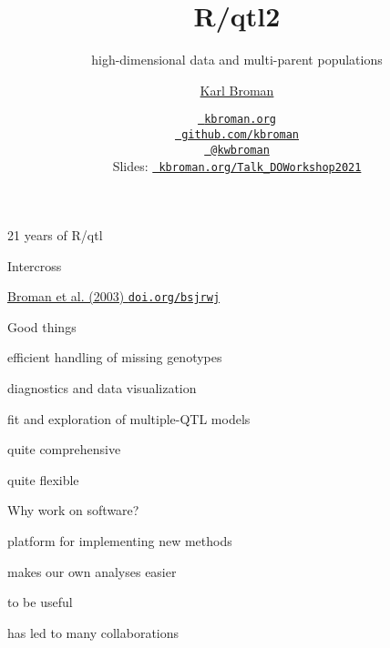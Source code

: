 \documentclass[12pt,t,aspectratio=169]{beamer}
\title{R/qtl2}
\subtitle{high-dimensional data and multi-parent populations}
\author{\href{https://kbroman.org}{Karl Broman}}
\institute{Biostatistics \& Medical Informatics, UW{\textendash}Madison}
\date{\href{https://kbroman.org}{\tt \scriptsize \color{foreground} kbroman.org}
\\[-4pt]
\href{https://github.com/kbroman}{\tt \scriptsize \color{foreground} github.com/kbroman}
\\[-4pt]
\href{https://twitter.com/kwbroman}{\tt \scriptsize \color{foreground} @kwbroman}
\\[2pt]
\scriptsize {\lolit Slides:} \href{https://kbroman.org/Talk_DOWorkshop2021}{\tt \scriptsize
  \color{foreground} kbroman.org/Talk\_DOWorkshop2021}
}
\begin{document}
{
 }



\begin{frame}[c]{21 years of R/qtl}


\end{frame}





\begin{frame}[c]{Intercross}
\end{frame}



\begin{frame}[c]{}



\hfill
\href{https://doi.org/10.1093/bioinformatics/btg112}{\scriptsize
  \lolit Broman et al. (2003) {\tt doi.org/bsjrwj}}

\end{frame}






\begin{frame}{Good things}

\bbi
  \item efficient handling of missing genotypes
  \item diagnostics and data visualization
  \item fit and exploration of multiple-QTL models
  \item quite comprehensive
  \item quite flexible
\ei

\end{frame}




\begin{frame}{Why work on software?}

  \bbi
\item platform for implementing new methods
\item makes our own analyses easier
\item to be useful
\item has led to many collaborations
  \ei

\end{frame}
\end{document}
